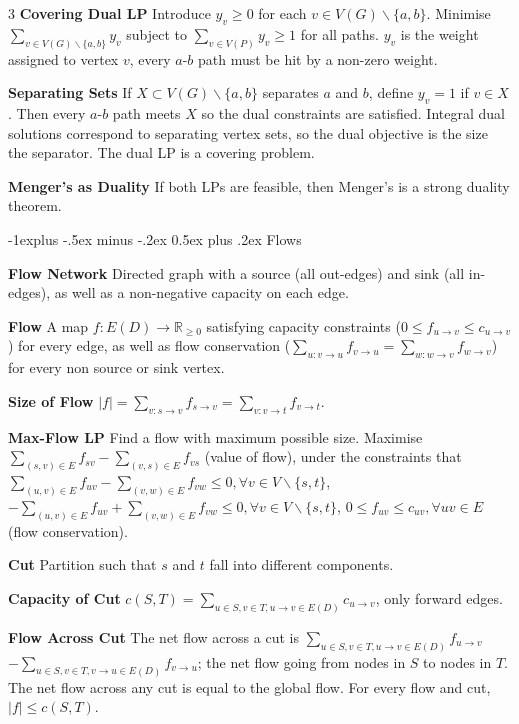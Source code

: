 \documentclass[10pt, landscape]{article}
\makeatletter
\renewcommand{\section}{\@startsection{section}{1}{0mm}%
                                {-1ex plus -.5ex minus -.2ex}%
                                {0.5ex plus .2ex}%
                                {\normalfont\large\bfseries}}
\renewcommand{\section}{\@startsection{section}{2}{0mm}%
                                {-1explus -.5ex minus -.2ex}%
                                {0.5ex plus .2ex}%
                                {\normalfont\normalsize\bfseries}}
\makeatother
\begin{document}
\begin{multicols*}{3}
\textbf{Covering Dual LP} Introduce $y_v \geq 0$ for each $v \in V(G) \backslash \{a,b\}$. Minimise $\sum_{v \in V(G) \backslash \{a, b\}}y_v$ subject to $\sum_{v \in V(P)} y_v \geq 1$ for all paths. $y_v$ is the weight assigned to vertex $v$, every $a$-$b$ path must be hit by a non-zero weight.

\textbf{Separating Sets} If $X \subset V(G) \backslash \{a,b\}$ separates $a$ and $b$, define $y_v=1$ if $v \in X$. Then every $a$-$b$ path meets $X$ so the dual constraints are satisfied. Integral dual solutions correspond to separating vertex sets, so the dual objective is the size the separator. The dual LP is a covering problem.

\textbf{Menger's as Duality} If both LPs are feasible, then Menger's is a strong duality theorem.

\section{Flows}

\textbf{Flow Network} Directed graph with a source (all out-edges) and sink (all in-edges), as well as a non-negative capacity on each edge.

\textbf{Flow} A map $f:E(D) \rightarrow \mathbb{R}_{\geq0}$ satisfying capacity constraints ($0 \leq f_{u \rightarrow v} \leq c_{u \rightarrow v}$) for every edge, as well as flow conservation ($\sum_{u: v\rightarrow u}f_{v\rightarrow u}=\sum_{w: w\rightarrow v}f_{w\rightarrow v}$) for every non source or sink vertex.

\textbf{Size of Flow} $|f|=\sum_{v: s\rightarrow v}f_{s\rightarrow v}=\sum_{v: v\rightarrow t}f_{v\rightarrow t}$.

\textbf{Max-Flow LP} Find a flow with maximum possible size. Maximise $\sum_{(s,v)\in E}f_{sv}-\sum_{(v,s)\in E}f_{vs}$ (value of flow), under the constraints that $\sum_{(u, v)\in E}f_{uv}-\sum_{(v, w) \in E}f_{vw} \leq 0, \forall v \in V \backslash \{s, t\}$, $-\sum_{(u, v)\in E}f_{uv}+\sum_{(v, w) \in E}f_{vw} \leq 0, \forall v \in V \backslash \{s, t\}$, $0 \leq f_{uv} \leq c_{uv}, \forall uv \in E$ (flow conservation).

\textbf{Cut} Partition such that $s$ and $t$ fall into different components.

\textbf{Capacity of Cut} $c(S, T)=\sum_{u \in S, v \in T, u \rightarrow v \in E(D)}c_{u \rightarrow v}$, only forward edges.

\textbf{Flow Across Cut} The net flow across a cut is $\sum_{u \in S, v \in T, u \rightarrow v \in E(D)}f_{u \rightarrow v}$ $- \sum_{u \in S, v \in T, v \rightarrow u \in E(D)}f_{v \rightarrow u}$; the net flow going from nodes in $S$ to nodes in $T$. The net flow across any cut is equal to the global flow. For every flow and cut, $|f| \leq c(S, T)$.


\end{multicols*}
\end{document}
